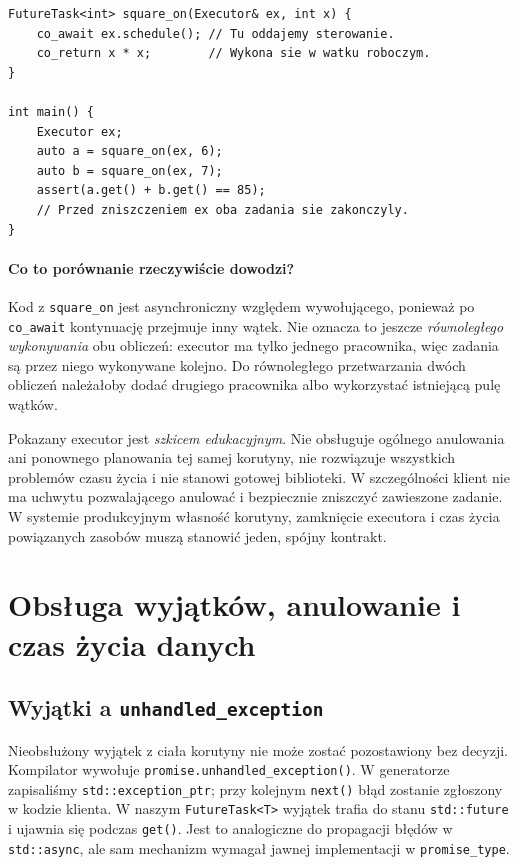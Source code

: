 \begin{lstlisting}[caption={Korutyna przechodząca do innego wątku poprzez executor (C++20); kompletny program.}]
FutureTask<int> square_on(Executor& ex, int x) {
    co_await ex.schedule(); // Tu oddajemy sterowanie.
    co_return x * x;        // Wykona sie w watku roboczym.
}

int main() {
    Executor ex;
    auto a = square_on(ex, 6);
    auto b = square_on(ex, 7);
    assert(a.get() + b.get() == 85);
    // Przed zniszczeniem ex oba zadania sie zakonczyly.
}
\end{lstlisting}

\paragraph{Co to porównanie rzeczywiście dowodzi?}
Kod z \texttt{square\_on} jest asynchroniczny względem wywołującego,
ponieważ po \texttt{co\_await} kontynuację przejmuje inny wątek.
Nie oznacza to jeszcze \emph{równoległego wykonywania} obu obliczeń:
executor ma tylko jednego pracownika, więc zadania są przez niego
wykonywane kolejno. Do równoległego przetwarzania dwóch obliczeń
należałoby dodać drugiego pracownika albo wykorzystać istniejącą
pulę wątków.

Pokazany executor jest \emph{szkicem edukacyjnym}. Nie obsługuje
ogólnego anulowania ani ponownego planowania tej samej korutyny,
nie rozwiązuje wszystkich problemów czasu życia i nie stanowi
gotowej biblioteki. W szczególności klient nie ma uchwytu pozwalającego
anulować i bezpiecznie zniszczyć zawieszone zadanie. W systemie
produkcyjnym własność korutyny, zamknięcie executora i czas życia
powiązanych zasobów muszą stanowić jeden, spójny kontrakt.

\section{Obsługa wyjątków, anulowanie i czas życia danych}
\label{sec:cpp15-errors}

\subsection{Wyjątki a \texttt{unhandled\_exception}}

Nieobsłużony wyjątek z ciała korutyny nie może zostać pozostawiony
bez decyzji. Kompilator wywołuje \texttt{promise.unhandled\_exception()}.
W generatorze zapisaliśmy \texttt{std::exception\_ptr}; przy kolejnym
\texttt{next()} błąd zostanie zgłoszony w kodzie klienta. W naszym
\texttt{FutureTask<T>} wyjątek trafia do stanu \texttt{std::future}
i ujawnia się podczas \texttt{get()}. Jest to analogiczne do
propagacji błędów w \texttt{std::async}, ale sam mechanizm wymagał
jawnej implementacji w \texttt{promise\_type}.

